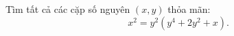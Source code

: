 \ifshowproblem
\begin{problem}\label{example:FRA-2015-TST4-P6}
    Tìm tất cả các cặp số nguyên \( (x, y) \) thỏa mãn:
    \[
        x^2 = y^2(y^4 + 2y^2 + x).
    \]
\end{problem}
\fi

\fi